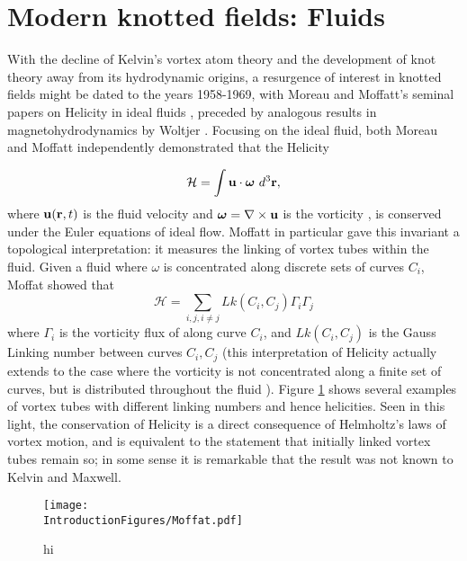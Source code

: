 \section{Modern knotted fields: Fluids}
With the decline of Kelvin's vortex atom theory and the development of knot theory away from its hydrodynamic origins, a resurgence of interest in knotted fields might be dated to the years 1958-1969, with Moreau and Moffatt's seminal papers on Helicity in ideal fluids \cite{Moreau,Moffat}, preceded by analogous results in magnetohydrodynamics by Woltjer \cite{Woltjer}. Focusing on the ideal fluid, both Moreau and Moffatt independently demonstrated that the Helicity

\begin{equation}
    \mathcal{H} = \int {\bf u} \cdot {\boldsymbol{\omega}} \ d^3 \bf r,
\end{equation}
where ${\bf u}({\bf r},t)$ is the fluid velocity and $\boldsymbol{\omega} = \nabla \times \bf u$ is the vorticity \cite{Saffman}, is conserved under the Euler equations of ideal flow. Moffatt in particular gave this invariant a topological interpretation: it measures the linking of vortex tubes within the fluid. Given a fluid where $\omega$ is concentrated along discrete sets of curves $C_i$, Moffat showed that
\begin{equation}
    \mathcal{H} = \sum_{i,j, i\neq j} Lk(C_i,C_j) \Gamma_i \Gamma_j 
\end{equation}
where $\Gamma_i$ is the vorticity flux of along curve $C_i$, and $Lk(C_i,C_j)$ is the Gauss Linking number between curves $C_i, C_j$ (this interpretation of Helicity actually extends to the case where the vorticity is not concentrated along a finite set of curves, but is distributed throughout the fluid \cite{Arnold,Berger,Berger}). Figure \ref{fig:Moffat} shows several examples of vortex tubes with different linking numbers and hence helicities. Seen in this light, the conservation of Helicity is a direct consequence of Helmholtz's laws of vortex motion, and is equivalent to the statement that initially linked vortex tubes remain so; in some sense it is remarkable that the result was not known to Kelvin and Maxwell.
\begin{figure}[htbp]
\centering
\texttt{[image: \\IntroductionFigures/Moffat.pdf]}
\caption{hi }
\label{fig:Moffat}
\end{figure}

